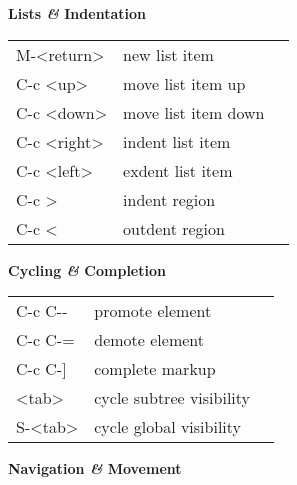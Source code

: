 \documentclass[10pt]{article}
\newcommand{\keyfont}{\keyfontfamily}
\newcommand{\decorfont}{\decorfontfamily}
\newcommand{\sectionfont}{\normalsize\headingfontfamily\bfseries}
\newcommand{\flourishfont}{\large\flourishfontfamily}
\newcommand{\key}[1]{{\keyfont #1}}
\newcommand{\desc}[1]{#1}
\renewcommand{\section}[1]{%
  \medskip%
  \centerline{%
    \ruleflourish{}%
    \hspace{1ex}%
    {\sectionfont #1}%
    \hspace{1ex}%
    \ruleflourish{}%
  }%
  \medskip}
\newcommand{\amper}{\textit{\&}}
\newcommand{\ruleflourish}{\flourishfont\XeTeXglyph405}
\begin{document}

\begin{minipage}[t]{0.5\textwidth}

\section{Lists \amper{} Indentation}

\begin{tabular}[t]{lll}
\key{M-<return>} & \desc{new list item}       \\
\key{C-c <up>}     & \desc{move list item up}   \\
\key{C-c <down>}   & \desc{move list item down} \\
\key{C-c <right>}  & \desc{indent list item}    \\
\key{C-c <left>}   & \desc{exdent list item}    \\
\key{C-c >}      & \desc{indent region}       \\
\key{C-c <}      & \desc{outdent region}      \\
\end{tabular}
\end{minipage}
%
\begin{minipage}[t]{0.5\textwidth}

\section{Cycling \amper{} Completion}

\begin{tabular}[t]{lll}
\key{C-c C-{}-} & \desc{promote element}          \\
\key{C-c C-=}   & \desc{demote element}           \\
\key{C-c C-]}   & \desc{complete markup}          \\
\key{<tab>}     & \desc{cycle subtree visibility} \\
\key{S-<tab>}   & \desc{cycle global visibility}  \\
\end{tabular}
\end{minipage}


\section{Navigation \amper{} Movement}
\end{document}
